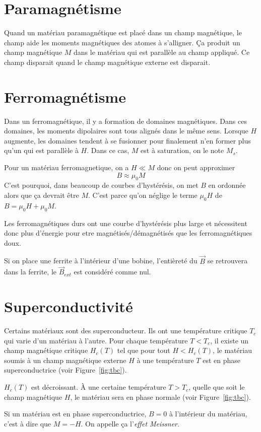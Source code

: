 \documentclass[11pt,a4paper]{article}
\newcommand{\B}{\vec B}
\begin{document}
\section{Paramagnétisme}
Quand un matériau paramagnétique est placé dans un champ magnétique, le champ aide les moments magnétiques des atomes à s'alligner.
Ça produit un champ magnétique $M$ dans le matériau qui est parallèle au champ appliqué.
Ce champ disparait quand le champ magnétique externe est disparait.

\section{Ferromagnétisme}
\label{sec:ferro}
Dans un ferromagnétique, il y a formation de domaines magnétiques.
Dans ces domaines, les moments dipolaires sont tous alignés dans le même sens.
Lorsque $H$ augmente, les domaines tendent à se fusionner pour finalement n'en former plus qu'un qui est parallèle à $H$.
Dans ce cas, $M$ est à saturation, on le note $M_s$.

Pour un matériau ferromagnetique, on a $H \ll M$ donc on peut approximer
\[ B \approx \mu_0 M \]
C'est pourquoi, dans beaucoup de courbes d'hystérésis, on met $B$ en ordonnée alors que ça devrait être $M$.
C'est parce qu'on néglige le terme $\mu_0 H$ de $B = \mu_0 H + \mu_0 M$.


Les ferromagnétiques durs ont une courbe d'hystérésis plus large et nécessitent donc plus d'énergie pour etre magnétisés/démagnétisés que les ferromagnétiques doux.

Si on place une ferrite à l'intérieur d'une bobine, l'entièreté du $\B$ se retrouvera dans la ferrite, le $\B_{ext}$ est considéré comme nul.

\section{Superconductivité}
Certains matériaux sont des superconducteur.
Ils ont une température critique $T_c$ qui varie d'un matériau à l'autre.
Pour chaque température $T < T_c$, il existe un champ magnétique critique $H_c(T)$ tel que
pour tout $H < H_c(T)$, le matériau soumis à un champ magnétique externe $H$ à une température $T$ est en phase superconductrice
(voir Figure~\ref{fig:tbc}).

$H_c(T)$ est décroissant.
À une certaine température $T > T_c$, quelle que soit le champ magnétique $H$, le matériau sera en phase normale (voir Figure~\ref{fig:tbc}).

Si un matériau est en phase superconductrice, $B = 0$ à l'intérieur du matériau, c'est à dire que $M = -H$.
On appelle ça l'\emph{effet Meissner}.
\end{document}
